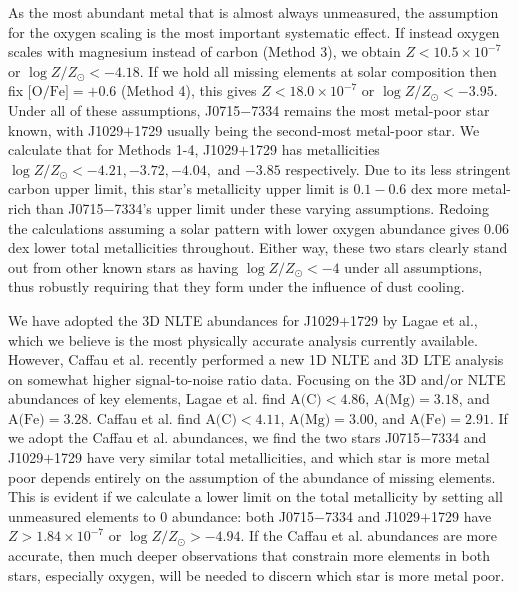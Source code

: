\documentclass{natureprintstyle}
\newcommand{\logzzsun}{\ensuremath{\log Z/Z_\odot}\xspace}
\newcommand{\umpstar}{J0715$-$7334\xspace}
\newcommand{\caffaustar}{J1029$+$1729\xspace}
\begin{document}
As the most abundant metal that is almost always unmeasured, the assumption for the oxygen scaling is the most important systematic effect.
If instead oxygen scales with magnesium instead of carbon (Method 3), we obtain $Z < 10.5 \times 10^{-7}$ or $\logzzsun < -4.18$.
If we hold all missing elements at solar composition then fix $\mbox{[O/Fe]}=+0.6$ (Method 4\cite{Lagae2023}), this gives $Z < 18.0 \times 10^{-7}$ or $\logzzsun < -3.95$.
Under all of these assumptions, \umpstar remains the most metal-poor star known, with \caffaustar usually being the second-most metal-poor star.
We calculate that for Methods 1-4, \caffaustar has metallicities $\logzzsun < -4.21, -3.72, -4.04,$ and $-3.85$ respectively. Due to its less stringent carbon upper limit, this star's metallicity upper limit is $0.1-0.6$ dex more metal-rich than \umpstar's upper limit under these varying assumptions.
Redoing the calculations assuming a solar pattern with lower oxygen abundance\cite{Asplund2021} gives 0.06 dex lower total metallicities throughout.
Either way, these two stars clearly stand out from other known stars as having $\logzzsun < -4$ under all assumptions, thus robustly requiring that they form under the influence of dust cooling\cite{Schneider2012}.

We have adopted the 3D NLTE abundances for \caffaustar by Lagae et al.\cite{Lagae2023}, which we believe is the most physically accurate analysis currently available. However, Caffau et al.\cite{Caffau2024} recently performed a new 1D NLTE and 3D LTE analysis on somewhat higher signal-to-noise ratio data.
Focusing on the 3D and/or NLTE abundances of key elements, Lagae et al. find $\mbox{A(C)} < 4.86$, $\mbox{A(Mg)} = 3.18$, and $\mbox{A(Fe)} = 3.28$. Caffau et al. find $\mbox{A(C)} < 4.11$, $\mbox{A(Mg)} = 3.00$, and $\mbox{A(Fe)} = 2.91$. If we adopt the Caffau et al. abundances, we find the two stars \umpstar and \caffaustar have very similar total metallicities, and which star is more metal poor depends entirely on the assumption of the abundance of missing elements. This is evident if we calculate a lower limit on the total metallicity by setting all unmeasured elements to 0 abundance: both \umpstar and \caffaustar have $Z > 1.84 \times 10^{-7}$ or $\logzzsun > -4.94$. If the Caffau et al. abundances are more accurate, then much deeper observations that constrain more elements in both stars, especially oxygen, will be needed to discern which star is more metal poor.
\end{document}
